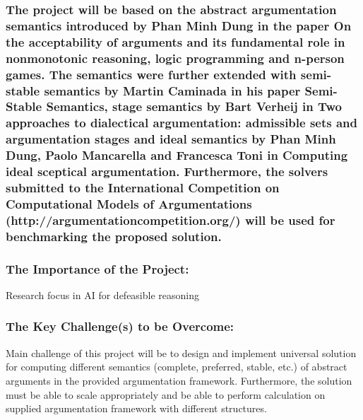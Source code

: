 \documentclass{article}
\begin{document}
\subsubsection[The project will be based on the abstract argumentation semantics introduced by Phan Minh Dung in the paper On the acceptability of arguments and its fundamental role in nonmonotonic reasoning, logic programming and n{}-person games. The semantics were further extended with semi{}-stable semantics by Martin Caminada in his paper Semi{}-Stable Semantics, stage semantics by Bart Verheij in Two approaches to dialectical argumentation: admissible sets and argumentation stages and ideal semantics by Phan Minh Dung, Paolo Mancarella and Francesca Toni in Computing ideal sceptical argumentation. Furthermore, the solvers submitted to the International Competition on Computational Models of Argumentations (http://argumentationcompetition.org/) will be used for benchmarking the proposed solution. ]{The project will be based on the abstract argumentation semantics introduced by Phan Minh Dung in the paper On the acceptability of arguments and its fundamental role in nonmonotonic reasoning, logic programming and n-person games. The semantics were further extended with semi-stable semantics by Martin Caminada in his paper Semi-Stable Semantics, stage semantics by Bart Verheij in Two approaches to dialectical argumentation: admissible sets and argumentation stages and ideal semantics by Phan Minh Dung, Paolo Mancarella and Francesca Toni in Computing ideal sceptical argumentation. Furthermore, the solvers submitted to the International Competition on Computational Models of Argumentations (http://argumentationcompetition.org/) will be used for benchmarking the proposed solution. }

\bigskip

\subsubsection{The Importance of the Project:}
Research focus in AI for defeasible reasoning


\bigskip

\subsubsection{The Key Challenge(s) to be Overcome:}
Main challenge of this project will be to design and implement universal solution for computing different semantics (complete, preferred, stable, etc.) of abstract arguments in the provided argumentation framework. Furthermore, the solution must be able to scale appropriately and be able to perform calculation on supplied argumentation framework with different structures.


\bigskip
\end{document}
